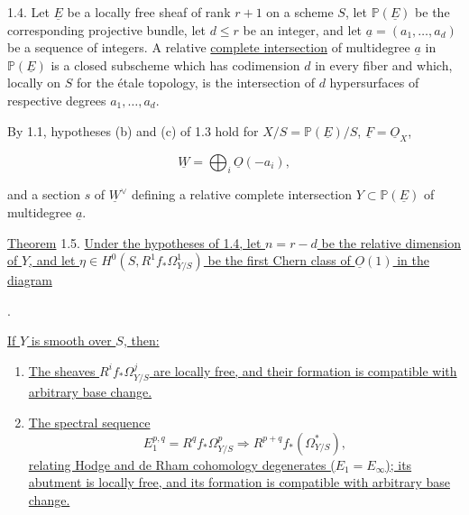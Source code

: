 
1.4. Let $\underline E$ be a locally free sheaf of rank $r+1$ on a scheme
$S$, let $\mathbb P(\underline E)$ be the corresponding projective bundle,
let $d\leq r$ be an integer, and let
$\underline a=(a_1,\ldots,a_d)$ be a sequence of integers.  A relative
\underline{complete intersection} of multidegree $\underline a$ in
$\mathbb P(\underline E)$ is a closed subscheme which has codimension $d$
in every fiber and which, locally on $S$ for the étale topology, is the
intersection of $d$ hypersurfaces of respective degrees
$a_1,\ldots,a_d$.

By 1.1, hypotheses (b) and (c) of 1.3 hold for
$X/S=\mathbb P(\underline E)/S$, $\underline F=\underline O_X$,

\begin{equation*}
\underline W=\bigoplus_i\underline O(-a_i),
\end{equation*}

and a section $s$ of $\underline W^\vee$ defining a relative complete
intersection $Y\subset\mathbb P(\underline E)$ of multidegree
$\underline a$.

\underline{Theorem} 1.5. \underline{Under the hypotheses of 1.4, let
$n=r-d$ be the relative dimension of $Y$, and let
$\eta\in H^0(S,R^1f_*\Omega^1_{Y/S})$ be the first Chern class of
$\underline O(1)$ in the diagram}

\begin{center}
\qquad .
\end{center}

\underline{If $Y$ is smooth over $S$, then:}

\begin{enumerate}[label=(\roman*),leftmargin=2.6em]
\item \underline{The sheaves $R^if_*\Omega^j_{Y/S}$ are locally free,
and their formation is compatible with arbitrary base change.}

\item \underline{The spectral sequence}
\begin{equation*}
E_1^{p,q}=R^qf_*\Omega^p_{Y/S}\Longrightarrow
R^{p+q}f_*(\Omega^*_{Y/S}),
\end{equation*}
\underline{relating Hodge and de Rham cohomology degenerates
($E_1=E_\infty$); its abutment is locally free, and its formation is
compatible with arbitrary base change.}
\end{enumerate}

